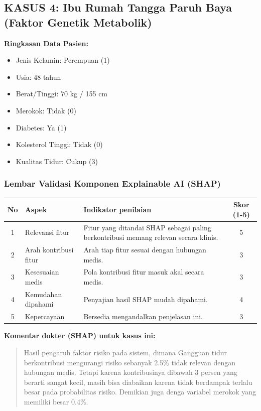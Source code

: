 \vspace{1.5cm}

\subsection*{KASUS 4: Ibu Rumah Tangga Paruh Baya (Faktor Genetik Metabolik)}
\textbf{Ringkasan Data Pasien:}
\begin{itemize}
    \item Jenis Kelamin: Perempuan (1)
    \item Usia: 48 tahun
    \item Berat/Tinggi: 70 kg / 155 cm
    \item Merokok: Tidak (0)
    \item Diabetes: Ya (1)
    \item Kolesterol Tinggi: Tidak (0)
    \item Kualitas Tidur: Cukup (3)
\end{itemize}

\subsubsection*{Lembar Validasi Komponen Explainable AI (SHAP)}
\begin{center}
\begin{tabular}{|c|p{3.5cm}|p{7.5cm}|c|}
\hline
\textbf{No} & \textbf{Aspek} & \textbf{Indikator penilaian} & \textbf{Skor (1-5)} \\ \hline
1 & Relevansi fitur & Fitur yang ditandai SHAP sebagai paling berkontribusi memang relevan secara klinis. & 5 \\ \hline
2 & Arah kontribusi fitur & Arah tiap fitur sesuai dengan hubungan medis. & 3 \\ \hline
3 & Kesesuaian medis & Pola kontribusi fitur masuk akal secara medis. & 3 \\ \hline
4 & Kemudahan dipahami & Penyajian hasil SHAP mudah dipahami. & 4 \\ \hline
5 & Kepercayaan & Bersedia mengandalkan penjelasan ini. & 3 \\ \hline
\end{tabular}
\end{center}

\textbf{Komentar dokter (SHAP) untuk kasus ini:}
\begin{quote}
Hasil pengaruh faktor risiko pada sistem, dimana Gangguan tidur berkontribusi mengurangi risiko sebanyak 2.5\% tidak relevan dengan hubungan medis. Tetapi karena kontribusinya dibawah 3 persen yang berarti sangat kecil, masih bisa diabaikan karena tidak berdampak terlalu besar pada probabilitas risiko. Demikian juga denga variabel merokok yang memiliki besar 0.4\%.
\end{quote}

